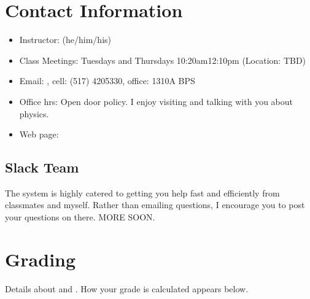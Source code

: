\documentclass[letterpaper,10pt,english]{jupyterBook}
\begin{document}
\section{Contact Information}
\label{\detokenize{content/0_course/syllabus:contact-information}}\begin{itemize}
\item {} 
\sphinxAtStartPar
Instructor:  (he/him/his)

\item {} 
\sphinxAtStartPar
Class Meetings: Tuesdays and Thursdays 10:20am\sphinxhyphen{}12:10pm (Location: TBD)

\item {} 
\sphinxAtStartPar
Email: , cell: (517) 420\sphinxhyphen{}5330, office:
1310\sphinxhyphen{}A BPS

\item {} 
\sphinxAtStartPar
Office hrs: Open door policy. I enjoy visiting and talking with you about physics.

\item {} 
\sphinxAtStartPar
Web page:

\end{itemize}


\subsection{Slack Team}
\label{\detokenize{content/0_course/syllabus:slack-team}}
\sphinxAtStartPar
{} The system is highly catered to getting you help fast and efficiently from classmates and myself. Rather than emailing questions, I encourage you to post your questions on there. MORE SOON.


\section{Grading}
\label{\detokenize{content/0_course/syllabus:grading}}
\sphinxAtStartPar
Details about {\hyperref[\detokenize{content/0_course/design::doc}]{}} and {\hyperref[\detokenize{content/0_course/assessments::doc}]{}}. How your grade is calculated appears below.
\end{document}
